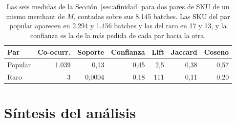 \begin{table}[ht]
    \centering
    \footnotesize
    \setlength{\tabcolsep}{4pt}
    \begin{tabular}{|l|r|r|r|r|r|r|}
        \hline
        \textbf{Par} & \textbf{Co-ocurr.} & \textbf{Soporte} & \textbf{Confianza} & \textbf{Lift} & \textbf{Jaccard} & \textbf{Coseno} \\
        \hline
        Popular & 1.039 & 0,13 & 0,45 & 2,5 & 0,38 & 0,57 \\
        \hline
        Raro & 3 & 0,0004 & 0,18 & 111 & 0,11 & 0,20 \\
        \hline
    \end{tabular}
    \caption{Las seis medidas de la Sección~\ref{sec:afinidad} para dos pares de SKU de un mismo merchant de $M$, contadas sobre sus 8.145 batches. Las SKU del par popular aparecen en 2.294 y 1.456 batches y las del raro en 17 y 13, y la confianza es la de la más pedida de cada par hacia la otra.}
    \label{tab:afinidad-datos}
\end{table}


\section{Síntesis del análisis}
\label{sec:sintesis-deposito}

